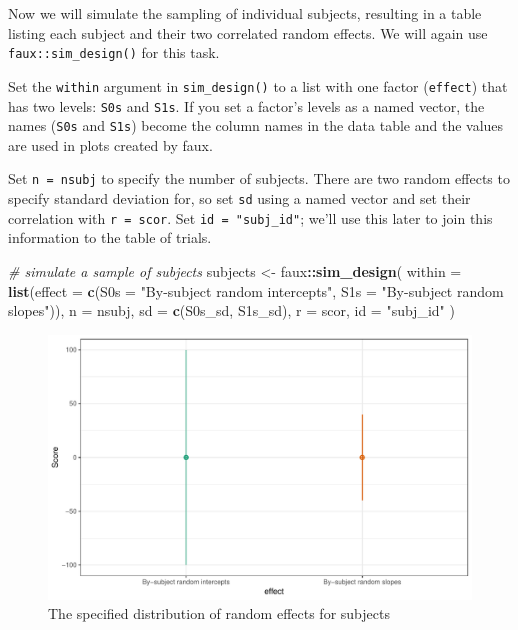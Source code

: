 \documentclass[doc,floatsintext]{apa6}
\newenvironment{Shaded}{\begin{snugshade}}{\end{snugshade}}
\newcommand{\KeywordTok}[1]{\textcolor[rgb]{0.13,0.29,0.53}{\textbf{#1}}}
\newcommand{\DataTypeTok}[1]{\textcolor[rgb]{0.13,0.29,0.53}{#1}}
\newcommand{\StringTok}[1]{\textcolor[rgb]{0.31,0.60,0.02}{#1}}
\newcommand{\CommentTok}[1]{\textcolor[rgb]{0.56,0.35,0.01}{\textit{#1}}}
\newcommand{\OperatorTok}[1]{\textcolor[rgb]{0.81,0.36,0.00}{\textbf{#1}}}
\newcommand{\NormalTok}[1]{#1}
\begin{document}
Now we will simulate the sampling of individual subjects, resulting in a
table listing each subject and their two correlated random effects. We
will again use \texttt{faux::sim\_design()} for this task.

Set the \texttt{within} argument in \texttt{sim\_design()} to a list
with one factor (\texttt{effect}) that has two levels: \texttt{S0s} and
\texttt{S1s}. If you set a factor's levels as a named vector, the names
(\texttt{S0s} and \texttt{S1s}) become the column names in the data
table and the values are used in plots created by faux.

Set \texttt{n\ =\ nsubj} to specify the number of subjects. There are
two random effects to specify standard deviation for, so set \texttt{sd}
using a named vector and set their correlation with \texttt{r = scor}.
Set \texttt{id\ =\ "subj\_id"}; we'll use this later to join this
information to the table of trials.

\begin{Shaded}
\begin{Highlighting}[]
\CommentTok{# simulate a sample of subjects}
\NormalTok{subjects <-}\StringTok{ }\NormalTok{faux}\OperatorTok{::}\KeywordTok{sim_design}\NormalTok{(}
  \DataTypeTok{within =} \KeywordTok{list}\NormalTok{(}\DataTypeTok{effect =} \KeywordTok{c}\NormalTok{(}\DataTypeTok{S0s =} \StringTok{"By-subject random intercepts"}\NormalTok{, }
                           \DataTypeTok{S1s =} \StringTok{"By-subject random slopes"}\NormalTok{)), }
  \DataTypeTok{n =}\NormalTok{ nsubj,}
  \DataTypeTok{sd =} \KeywordTok{c}\NormalTok{(S0s_sd, S1s_sd), }
  \DataTypeTok{r =}\NormalTok{ scor,}
  \DataTypeTok{id =} \StringTok{"subj_id"}
\NormalTok{)}
\end{Highlighting}
\end{Shaded}

\begin{figure}

{\centering \includegraphics[width=0.75\linewidth]{images/sim-subjects-1} 

}

\caption{The specified distribution of random effects for subjects}\label{fig:sim-subjects}
\end{figure}
\end{document}
